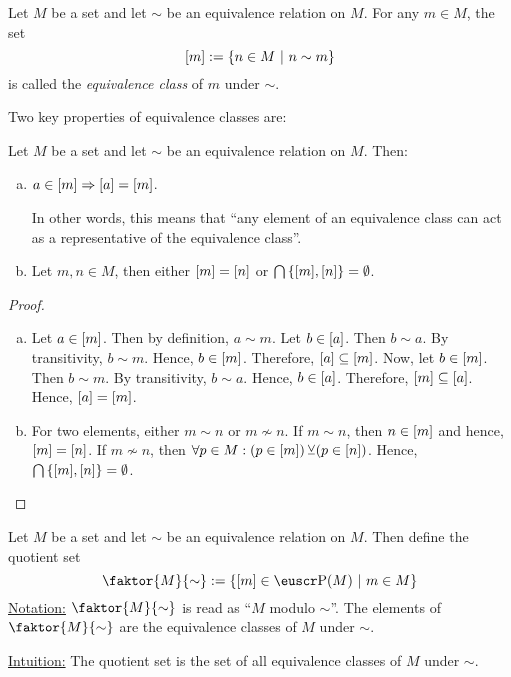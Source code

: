 \begin{definition}
	Let \(M\) be a set and let \(\sim\) be an equivalence relation on \(M\). For any \(m \in M\), the set
	\begin{equation}
		\qty[m] := \qty{n \in M \ \middle|\ n \sim m}
	\end{equation}
	is called the \emph{equivalence class} of \(m\) under \(\sim\).
\end{definition}\noindent
Two key properties of equivalence classes are:
\begin{proposition}
	Let \(M\) be a set and let \(\sim\) be an equivalence relation on \(M\). Then:
	\begin{enumerate}[(a)]
		\item \(a \in \qty[m] \Rightarrow \qty[a] = \qty[m]\).

		      In other words, this means that ``any element of an equivalence class can act as a representative of the equivalence class''.

		\item Let \(m, n \in M\), then either \(\qty[m] = \qty[n]\) or \(\bigcap\qty{\qty[m], \qty[n]} = \emptyset\).
	\end{enumerate}
\end{proposition}
\begin{proof}
	\begin{enumerate}[(a)]
		\item Let \(a \in \qty[m]\). Then by definition, \(a \sim m\). Let \(b \in \qty[a]\). Then \(b \sim a\). By transitivity, \(b \sim m\). Hence, \(b \in \qty[m]\). Therefore, \(\qty[a] \subseteq \qty[m]\). Now, let \(b \in \qty[m]\). Then \(b \sim m\). By transitivity, \(b \sim a\). Hence, \(b \in \qty[a]\). Therefore, \(\qty[m] \subseteq \qty[a]\). Hence, \(\qty[a] = \qty[m]\).

		\item For two elements, either \(m \sim n\) or \(m \nsim n\). If \(m \sim n\), then \(n \in \qty[m]\) and hence, \(\qty[m] = \qty[n]\). If \(m \nsim n\), then \(\forall p \in M: (p \in \qty[m]) \operatorname{\veebar} (p \in \qty[n])\). Hence, \(\bigcap\qty{\qty[m], \qty[n]} = \emptyset\).
	\end{enumerate}
\end{proof}

\begin{definition}
	Let \(M\) be a set and let \(\sim\) be an equivalence relation on \(M\). Then define the quotient set
	\begin{equation}
		\faktor{M}{\sim} := \qty{\qty[m] \in \powerset(M) \mid m \in M}
	\end{equation}
	\uline{Notation:} \(\faktor{M}{\sim}\) is read as ``\(M\) modulo \(\sim\)''. The elements of \(\faktor{M}{\sim}\) are the equivalence classes of \(M\) under \(\sim\).
\end{definition}\noindent
\uline{Intuition:} The quotient set is the set of all equivalence classes of \(M\) under \(\sim\).

